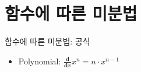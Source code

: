 \documentclass[aspectratio=169]{beamer}
\begin{document}







\section{함수에 따른 미분법}

\begin{frame}{함수에 따른 미분법: 공식}
  \begin{itemize}
    \item Polynomial: $ \frac{\mathbf{d}}{\mathbf{d}x} x^n = n \cdot x^{n-1}  $
  \end{itemize}
\end{frame}

    
  
\end{document}
